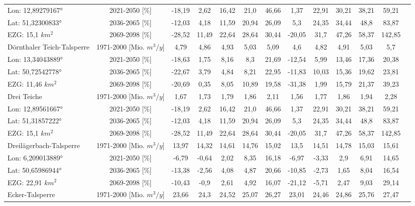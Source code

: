 \begin{longtable}{@{\extracolsep{\fill}}lc|ccccc||cccccc}
\cline{2-13} 
Lon: 12,89279167° & 2021-2050 [\%]  & -18,19 & 2,62 & 16,42 & 21,0 & 46,66 & 1,37 & 22,91 & 30,21 & 38,21 & 59,21 & \\ 
Lat: 51,32300833° & 2036-2065 [\%]  & -12,03 & 4,18 & 11,59 & 20,94 & 26,09 & 5,3 & 24,35 & 34,44 & 48,8 & 83,87 & \\ 
EZG: 15,1 $km^2$ & 2069-2098 [\%]  & -28,52 & 11,49 & 22,64 & 28,64 & 30,44 & -20,05 & 31,7 & 47,26 & 58,37 & 142,85 & \\ 
\hline 
Dörnthaler Teich-Talsperre & 1971-2000 [Mio. $m^3/y$]  & 4,79 & 4,86 & 4,93 & 5,03 & 5,09 & 4,6 & 4,82 & 4,91 & 5,03 & 5,7 & \\ 
\cline{2-13} 
Lon: 13,34043889° & 2021-2050 [\%]  & -18,63 & 1,75 & 8,16 & 8,3 & 21,69 & -12,54 & 5,99 & 13,46 & 17,36 & 20,38 & \\ 
Lat: 50,72542778° & 2036-2065 [\%]  & -22,67 & 3,79 & 4,84 & 8,21 & 22,95 & -11,83 & 10,03 & 15,36 & 19,62 & 23,81 & \\ 
EZG: 11,46 $km^2$ & 2069-2098 [\%]  & -20,69 & 0,35 & 8,05 & 10,89 & 19,58 & -31,38 & 1,99 & 15,79 & 21,37 & 39,23 & \\ 
\hline 
Drei Teiche & 1971-2000 [Mio. $m^3/y$]  & 1,67 & 1,73 & 1,79 & 1,86 & 2,11 & 1,56 & 1,77 & 1,86 & 1,94 & 2,28 & \\ 
\cline{2-13} 
Lon: 12,89561667° & 2021-2050 [\%]  & -18,19 & 2,62 & 16,42 & 21,0 & 46,66 & 1,37 & 22,91 & 30,21 & 38,21 & 59,21 & \\ 
Lat: 51,31857222° & 2036-2065 [\%]  & -12,03 & 4,18 & 11,59 & 20,94 & 26,09 & 5,3 & 24,35 & 34,44 & 48,8 & 83,87 & \\ 
EZG: 15,1 $km^2$ & 2069-2098 [\%]  & -28,52 & 11,49 & 22,64 & 28,64 & 30,44 & -20,05 & 31,7 & 47,26 & 58,37 & 142,85 & \\ 
\hline 
Dreilägerbach-Talsperre & 1971-2000 [Mio. $m^3/y$]  & 13,97 & 14,32 & 14,61 & 14,76 & 15,02 & 13,5 & 14,51 & 14,78 & 15,03 & 15,61 & \\ 
\cline{2-13} 
Lon: 6,209013889° & 2021-2050 [\%]  & -6,79 & -0,64 & 2,02 & 8,35 & 16,18 & -6,97 & -3,33 & 2,9 & 6,91 & 14,65 & \\ 
Lat: 50,65986944° & 2036-2065 [\%]  & -13,38 & -2,56 & 4,08 & 4,87 & 20,66 & -10,85 & -2,73 & 1,65 & 8,04 & 16,54 & \\ 
EZG: 22,91 $km^2$ & 2069-2098 [\%]  & -10,43 & -0,9 & 2,61 & 4,92 & 16,07 & -21,12 & -5,71 & 2,47 & 9,03 & 29,14 & \\ 
\hline 
Ecker-Talsperre & 1971-2000 [Mio. $m^3/y$]  & 23,66 & 24,3 & 24,52 & 25,07 & 26,27 & 23,01 & 24,46 & 24,86 & 25,76 & 27,47 & \\ 

\end{longtable}
